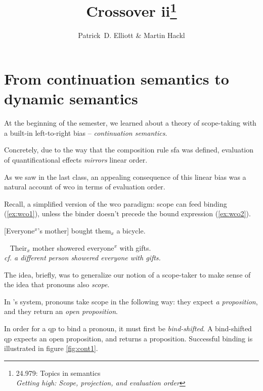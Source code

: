 \documentclass[nols,twoside,nofonts,nobib,nohyper]{tufte-handout}
\title{Crossover ii\thanks{24.979: Topics in
    semantics\\\noindent\textit{Getting high: Scope, projection, and evaluation order}}}
\author[Patrick D. Elliott and Martin Hackl]{Patrick~D. Elliott\sidenote{\texttt{pdell@mit.edu}} \& Martin Hackl\sidenote{\texttt{hackl@mit.edu}}}
\begin{document}
\maketitle%

\section{From continuation semantics to dynamic semantics}

At the beginning of the semester, we learned about a theory of scope-taking with
a built-in left-to-right bias -- \textit{continuation semantics}.

Concretely, due to the way that the composition rule \ac{sfa} was defined,
evaluation of quantificational effects \textit{mirrors} linear
order.

As we saw in the last class, an appealing consequence of this linear bias was a
natural account of \acf{wco} in terms of evaluation order.

Recall, a simplified version of the \ac{wco} paradigm: scope can feed binding
(\ref{ex:wco1}), unless the binder doesn't precede the bound expression (\ref{ex:wco2}).

\ex
{}[Everyone$^{x}$'s mother] bought them$_{x}$ a bicycle.\label{ex:wco1}
\xe

\ex~
Their$_{x}$ mother showered everyone$^{x}$ with gifts.\\
\textit{cf. a different person showered everyone with gifts.}\label{ex:wco2}
\xe

The idea, briefly, was to generalize our notion of a scope-taker to make sense
of the idea that pronouns also \textit{scope}.

In \citeauthor{barkerShan2015}'s system, pronouns take scope in the following
way: they expect \textit{a proposition}, and they return an \textit{open
  proposition}.

In order for a \ac{qp} to bind a pronoun, it must first be
\textit{bind-shifted}. A bind-shifted \ac{qp} expects an open proposition, and
returns a proposition. Successful binding is illustrated in figure \ref{fig:cont1}.
\end{document}

